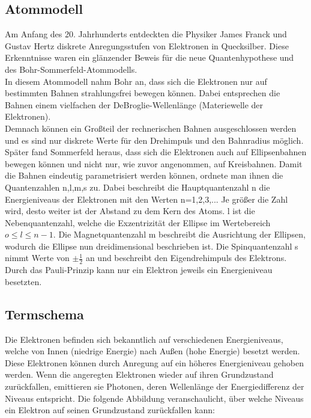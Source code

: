 \documentclass{article}
\begin{document}
\subsection{Atommodell}
Am Anfang des 20. Jahrhunderts entdeckten die Physiker James Franck und Gustav Hertz diskrete Anregungsstufen  von Elektronen in Quecksilber. Diese Erkenntnisse waren ein glänzender Beweis für die neue Quantenhypothese und des Bohr-Sommerfeld-Atommodells.\\
In diesem Atommodell nahm Bohr an, dass sich die Elektronen nur auf bestimmten Bahnen strahlungsfrei bewegen können. Dabei entsprechen die Bahnen einem vielfachen der DeBroglie-Wellenlänge (Materiewelle der Elektronen).\\
Demnach können ein Großteil der rechnerischen Bahnen ausgeschlossen werden und es sind nur diskrete Werte für den Drehimpuls und den Bahnradius möglich. Später fand Sommerfeld heraus, dass sich die Elektronen auch auf Ellipsenbahnen bewegen können und nicht nur, wie zuvor angenommen, auf Kreisbahnen. Damit die Bahnen eindeutig parametrisiert werden können, ordnete man ihnen die Quantenzahlen n,l,m,s zu. Dabei beschreibt die Hauptquantenzahl n die Energieniveaus der Elektronen mit den Werten n=1,2,3,... Je größer die Zahl wird, desto weiter ist der Abstand zu dem Kern des Atoms. l ist die Nebenquantenzahl, welche die Exzentrizität der Ellipse im Wertebereich \(o\leq l\leq n-1\). Die Magnetquantenzahl m beschreibt die Ausrichtung der Ellipsen, wodurch die Ellipse nun dreidimensional beschrieben ist. Die Spinquantenzahl s nimmt Werte von \(\pm\frac{1}{2}\) an und beschreibt den Eigendrehimpuls des Elektrons. Durch das Pauli-Prinzip kann nur ein Elektron jeweils ein Energieniveau besetzten.

\subsection{Termschema}
Die Elektronen befinden sich bekanntlich auf verschiedenen Energieniveaus, welche von Innen (niedrige Energie) nach Außen (hohe Energie) besetzt werden. Diese Elektronen können durch Anregung auf ein höheres Energieniveau gehoben werden. Wenn die angeregten Elektronen wieder auf ihren Grundzustand zurückfallen, emittieren sie Photonen, deren Wellenlänge der Energiedifferenz der Niveaus entspricht. Die folgende Abbildung veranschaulicht, über welche Niveaus ein Elektron auf seinen Grundzustand zurückfallen kann:
\end{document}
